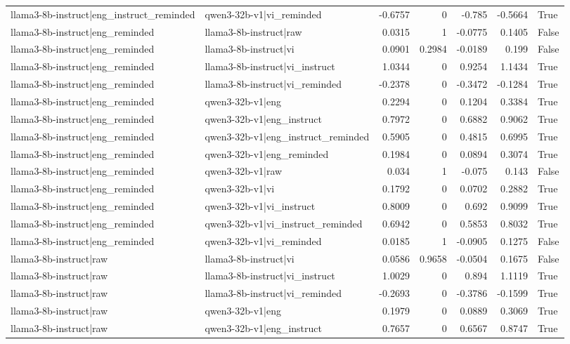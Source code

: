\begin{table}
\begin{tabular}{l l r r r r l}
llama3-8b-instruct|eng_instruct_reminded & qwen3-32b-v1|vi_reminded & -0.6757 & 0 & -0.785 & -0.5664 & True \\
llama3-8b-instruct|eng_reminded & llama3-8b-instruct|raw & 0.0315 & 1 & -0.0775 & 0.1405 & False \\
llama3-8b-instruct|eng_reminded & llama3-8b-instruct|vi & 0.0901 & 0.2984 & -0.0189 & 0.199 & False \\
llama3-8b-instruct|eng_reminded & llama3-8b-instruct|vi_instruct & 1.0344 & 0 & 0.9254 & 1.1434 & True \\
llama3-8b-instruct|eng_reminded & llama3-8b-instruct|vi_reminded & -0.2378 & 0 & -0.3472 & -0.1284 & True \\
llama3-8b-instruct|eng_reminded & qwen3-32b-v1|eng & 0.2294 & 0 & 0.1204 & 0.3384 & True \\
llama3-8b-instruct|eng_reminded & qwen3-32b-v1|eng_instruct & 0.7972 & 0 & 0.6882 & 0.9062 & True \\
llama3-8b-instruct|eng_reminded & qwen3-32b-v1|eng_instruct_reminded & 0.5905 & 0 & 0.4815 & 0.6995 & True \\
llama3-8b-instruct|eng_reminded & qwen3-32b-v1|eng_reminded & 0.1984 & 0 & 0.0894 & 0.3074 & True \\
llama3-8b-instruct|eng_reminded & qwen3-32b-v1|raw & 0.034 & 1 & -0.075 & 0.143 & False \\
llama3-8b-instruct|eng_reminded & qwen3-32b-v1|vi & 0.1792 & 0 & 0.0702 & 0.2882 & True \\
llama3-8b-instruct|eng_reminded & qwen3-32b-v1|vi_instruct & 0.8009 & 0 & 0.692 & 0.9099 & True \\
llama3-8b-instruct|eng_reminded & qwen3-32b-v1|vi_instruct_reminded & 0.6942 & 0 & 0.5853 & 0.8032 & True \\
llama3-8b-instruct|eng_reminded & qwen3-32b-v1|vi_reminded & 0.0185 & 1 & -0.0905 & 0.1275 & False \\
llama3-8b-instruct|raw & llama3-8b-instruct|vi & 0.0586 & 0.9658 & -0.0504 & 0.1675 & False \\
llama3-8b-instruct|raw & llama3-8b-instruct|vi_instruct & 1.0029 & 0 & 0.894 & 1.1119 & True \\
llama3-8b-instruct|raw & llama3-8b-instruct|vi_reminded & -0.2693 & 0 & -0.3786 & -0.1599 & True \\
llama3-8b-instruct|raw & qwen3-32b-v1|eng & 0.1979 & 0 & 0.0889 & 0.3069 & True \\
llama3-8b-instruct|raw & qwen3-32b-v1|eng_instruct & 0.7657 & 0 & 0.6567 & 0.8747 & True \\

\end{tabular}
\end{table}
